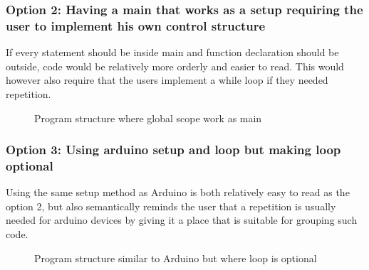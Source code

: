 \subsubsection{Option 2: Having a main that works as a setup requiring the user to implement his own control structure}
If every statement should be inside main and function declaration should be outside, code would be relatively more orderly and easier to read. 
This would however also require that the users implement a while loop if they needed repetition. 
\begin{figure}[H]
\centering
{}
\caption{Program structure where global scope work as main}
\label{lf10}
\end{figure}

\subsubsection{Option 3: Using arduino setup and loop but making loop optional}
Using the same setup method as Arduino is both relatively easy to read as the option 2, but also semantically reminds the user that a repetition is usually needed for arduino devices by giving it a place that is suitable for grouping such code.
\begin{figure}[H]
\centering
{}
\caption{Program structure similar to Arduino but where loop is optional}
\label{lf10}
\end{figure}

